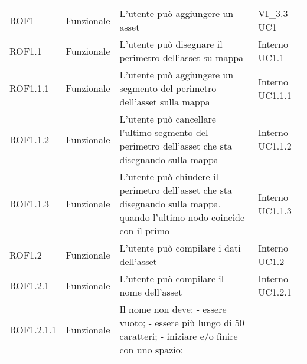 \begin{longtable}{p{2cm}!{\VRule[1pt]}p{2cm}!{\VRule[1pt]}p{5cm}!{\VRule[1pt]}p{1.5cm}}
	ROF1                             & Funzionale\newline               & L'utente può aggiungere un asset                                                                                         & VI_3.3 \newline UC1          
	\\
	ROF1.1                           & Funzionale\newline               & L'utente può disegnare il perimetro dell'asset su mappa                                                                  & Interno \newline UC1.1       
	\\
	ROF1.1.1                         & Funzionale\newline               & L'utente può aggiungere un segmento del perimetro dell'asset sulla mappa                                                 & Interno \newline UC1.1.1     
	\\
	ROF1.1.2                         & Funzionale\newline               & L'utente può cancellare l'ultimo segmento del perimetro dell'asset che sta disegnando sulla mappa                        & Interno \newline UC1.1.2     
	\\
	ROF1.1.3                         & Funzionale\newline               & L'utente può chiudere il perimetro dell'asset che sta disegnando sulla mappa, quando l'ultimo nodo coincide con il primo & Interno \newline UC1.1.3     
	\\
	ROF1.2                           & Funzionale\newline               & L'utente può compilare i dati dell'asset                                                                                 & Interno \newline UC1.2       
	\\
	ROF1.2.1                         & Funzionale\newline               & L'utente può compilare il nome dell'asset                                                                                & Interno \newline UC1.2.1     
	\\
	ROF1.2.1.1&Funzionale\newline  & Il nome non deve: 
	- essere vuoto;
	- essere più lungo di 50 caratteri;
	- iniziare e/o finire con uno spazio; 

\end{longtable}
